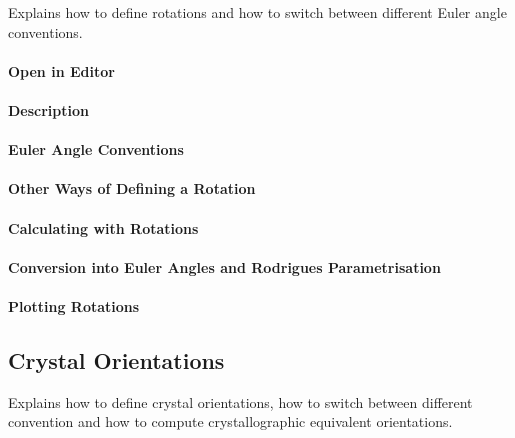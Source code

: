 \documentclass{article}
\begin{document}
		
                     \begin{par}
Explains how to define rotations and how to switch between different Euler angle conventions.
\end{par} \vspace{1em}

                  
			\paragraph{Open in Editor}
		
			\paragraph{Description}
		
			\paragraph{Euler Angle Conventions}
		
			\paragraph{Other Ways of Defining a Rotation}
		
			\paragraph{Calculating with Rotations}
		
			\paragraph{Conversion into Euler Angles and Rodrigues Parametrisation}
		
			\paragraph{Plotting Rotations}
		
		\subsection{Crystal Orientations}

		
                     \begin{par}
Explains how to define crystal orientations, how to switch between different convention and how to compute crystallographic equivalent orientations.
\end{par} \vspace{1em}
\end{document}
